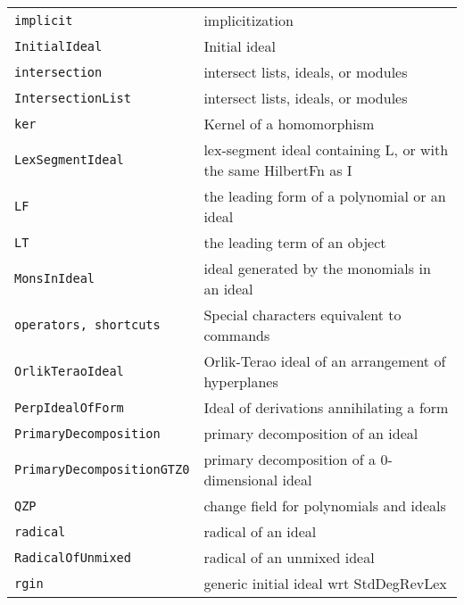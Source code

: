 \documentclass[a4paper]{mybook}
\begin{document}
\begin{center}
\begin{longtable}{ll}
{\verb~implicit~} &
      implicitization\\
   
{\verb~InitialIdeal~} &
      Initial ideal\\
   
{\verb~intersection~} &
      intersect lists, ideals, or modules\\
   
{\verb~IntersectionList~} &
      intersect lists, ideals, or modules\\
   
{\verb~ker~} &
      Kernel of a homomorphism\\
   
{\verb~LexSegmentIdeal~} &
      lex-segment ideal containing L, or with the same HilbertFn as I\\
   
{\verb~LF~} &
      the leading form of a polynomial or an ideal\\
   
{\verb~LT~} &
      the leading term of an object\\
   
{\verb~MonsInIdeal~} &
      ideal generated by the monomials in an ideal\\
   
{\verb~operators, shortcuts~} &
      Special characters equivalent to commands\\
   
{\verb~OrlikTeraoIdeal~} &
      Orlik-Terao ideal of an arrangement of hyperplanes\\
   
{\verb~PerpIdealOfForm~} &
      Ideal of derivations annihilating a form\\
   
{\verb~PrimaryDecomposition~} &
      primary decomposition of an ideal\\
   
{\verb~PrimaryDecompositionGTZ0~} &
      primary decomposition of a 0-dimensional ideal\\
   
{\verb~QZP~} &
      change field for polynomials and ideals\\
   
{\verb~radical~} &
      radical of an ideal\\
   
{\verb~RadicalOfUnmixed~} &
      radical of an unmixed ideal\\
   
{\verb~rgin~} &
      generic initial ideal wrt StdDegRevLex\\
   

\end{longtable}
\end{center}
\end{document}
